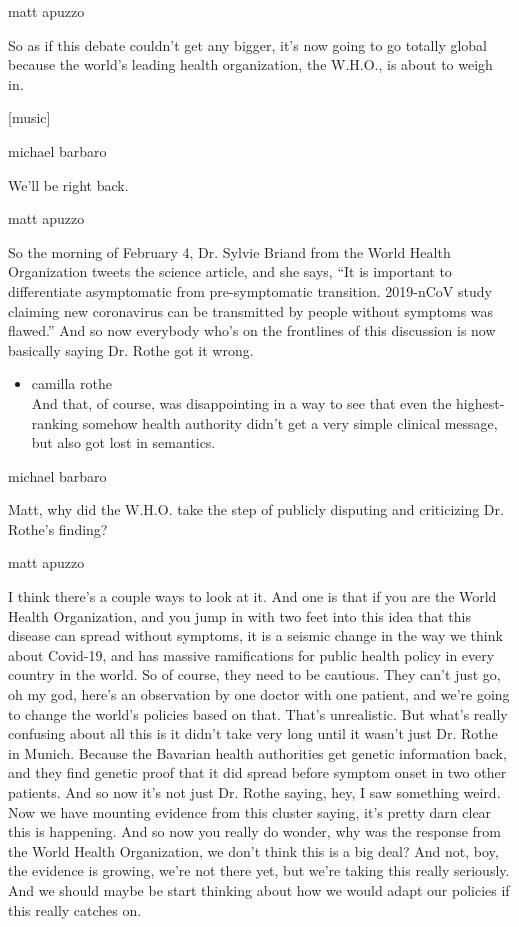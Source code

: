 matt apuzzo

So as if this debate couldn't get any bigger, it's now going to go
totally global because the world's leading health organization, the
W.H.O., is about to weigh in.

{[}music{]}

michael barbaro

We'll be right back.

matt apuzzo

So the morning of February 4, Dr. Sylvie Briand from the World Health
Organization tweets the science article, and she says, ``It is important
to differentiate asymptomatic from pre-symptomatic transition. 2019-nCoV
study claiming new coronavirus can be transmitted by people without
symptoms was flawed.'' And so now everybody who's on the frontlines of
this discussion is now basically saying Dr. Rothe got it wrong.

\begin{itemize}
\tightlist
\item
  camilla rothe\\
  And that, of course, was disappointing in a way to see that even the
  highest-ranking somehow health authority didn't get a very simple
  clinical message, but also got lost in semantics.
\end{itemize}

michael barbaro

Matt, why did the W.H.O. take the step of publicly disputing and
criticizing Dr. Rothe's finding?

matt apuzzo

I think there's a couple ways to look at it. And one is that if you are
the World Health Organization, and you jump in with two feet into this
idea that this disease can spread without symptoms, it is a seismic
change in the way we think about Covid-19, and has massive ramifications
for public health policy in every country in the world. So of course,
they need to be cautious. They can't just go, oh my god, here's an
observation by one doctor with one patient, and we're going to change
the world's policies based on that. That's unrealistic. But what's
really confusing about all this is it didn't take very long until it
wasn't just Dr. Rothe in Munich. Because the Bavarian health authorities
get genetic information back, and they find genetic proof that it did
spread before symptom onset in two other patients. And so now it's not
just Dr. Rothe saying, hey, I saw something weird. Now we have mounting
evidence from this cluster saying, it's pretty darn clear this is
happening. And so now you really do wonder, why was the response from
the World Health Organization, we don't think this is a big deal? And
not, boy, the evidence is growing, we're not there yet, but we're taking
this really seriously. And we should maybe be start thinking about how
we would adapt our policies if this really catches on.

